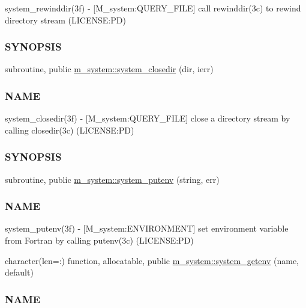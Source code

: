\begin{DoxyCompactItemize}
\begin{DoxyCompactList}
system\+\_\+rewinddir(3f) -\/ \mbox{[}M\+\_\+system\+:Q\+U\+E\+R\+Y\+\_\+\+F\+I\+LE\mbox{]} call rewinddir(3c) to rewind directory stream (L\+I\+C\+E\+N\+SE\+:PD) \subsubsection*{S\+Y\+N\+O\+P\+S\+IS}\end{DoxyCompactList}\item 
subroutine, public \mbox{\hyperlink{namespacem__system_acd442b52c64fc50482bc08b0ac8a50d1}{m\+\_\+system\+::system\+\_\+closedir}} (dir, ierr)
\begin{DoxyCompactList}\small\item\em \subsubsection*{N\+A\+ME}

system\+\_\+closedir(3f) -\/ \mbox{[}M\+\_\+system\+:Q\+U\+E\+R\+Y\+\_\+\+F\+I\+LE\mbox{]} close a directory stream by calling closedir(3c) (L\+I\+C\+E\+N\+SE\+:PD) \subsubsection*{S\+Y\+N\+O\+P\+S\+IS}\end{DoxyCompactList}\item 
subroutine, public \mbox{\hyperlink{namespacem__system_af0c9df8e59cac9cd617cd1e20448ea7d}{m\+\_\+system\+::system\+\_\+putenv}} (string, err)
\begin{DoxyCompactList}\small\item\em \subsubsection*{N\+A\+ME}

system\+\_\+putenv(3f) -\/ \mbox{[}M\+\_\+system\+:E\+N\+V\+I\+R\+O\+N\+M\+E\+NT\mbox{]} set environment variable from Fortran by calling putenv(3c) (L\+I\+C\+E\+N\+SE\+:PD) \end{DoxyCompactList}\item 
character(len=\+:) function, allocatable, public \mbox{\hyperlink{namespacem__system_a0f91f973a4288ebda0e75ea0869a43af}{m\+\_\+system\+::system\+\_\+getenv}} (name, default)
\begin{DoxyCompactList}\small\item\em \subsubsection*{N\+A\+ME}


\end{DoxyCompactList}
\end{DoxyCompactItemize}
